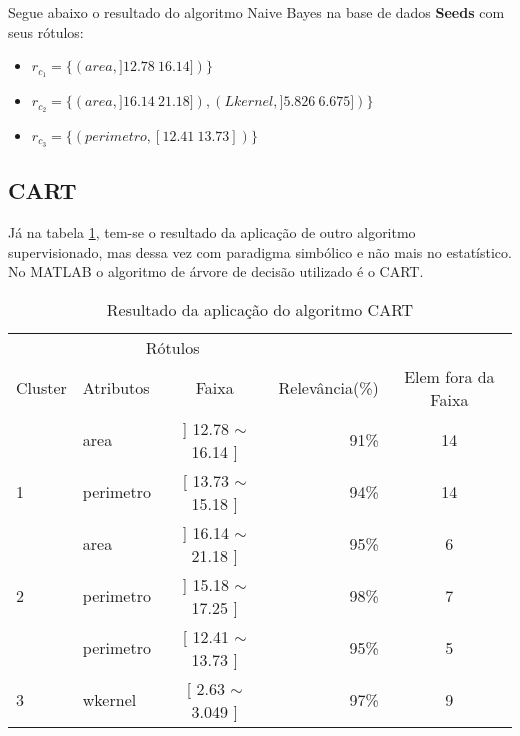 Segue abaixo o resultado do algoritmo Naive Bayes na base de dados \textbf{Seeds} com seus rótulos: 
\begin{itemize}[noitemsep]
 \item ${r_{c_1}=\{ (area, ]12.78 ~ 16.14]) \} }$  
 \item ${r_{c_2}=\{ (area, ]16.14 ~ 21.18]), (Lkernel, ]5.826 ~ 6.675]) \} }$
 \item ${r_{c_3}=\{ (perimetro, [12.41 ~ 13.73])\} }$
\end{itemize}


\subsection{CART}

Já na tabela \ref{tab:rot:seeds:cart}, tem-se o resultado da aplicação de outro algoritmo supervisionado, mas dessa vez com paradigma simbólico e não mais no estatístico. No MATLAB o algoritmo de árvore de decisão utilizado é o CART. 

\begin{table}[!h]
\centering
\caption{Resultado da aplicação do algoritmo CART}
\label{tab:rot:seeds:cart}
\begin{tabular}{llcrc}\hline\hline 

\multicolumn{1}{c}{\cellcolor[HTML]{FFFFFF}} & \multicolumn{2}{c}{Rótulos}                      & \multicolumn{1}{r}{}            \\ \cline{2-3}
Cluster                                      & Atributos      & \multicolumn{1}{c}{Faixa}       & \multicolumn{1}{c}{Relevância(\%)} & Elem fora da Faixa \\ \hline \hline
                                             & area           & ] 12.78 $\sim$  16.14 ]         & 91\%          & 14 \\  
\multirow{-2}{*}{1}                          & perimetro      & [ 13.73 $\sim$ 15.18 ]          & 94\%          & 14\\ \hline
                                             & area           & ] 16.14 $\sim$  21.18 ]          & 95\%         & 6 \\ 
\multirow{-2}{*}{2}                          & perimetro      & ] 15.18 $\sim$  17.25 ]          & 98\%         & 7\\  \hline
                                             & perimetro      & [ 12.41 $\sim$  13.73 ]         & 95\%          & 5 \\
\multirow{-2}{*}{3}                          & wkernel        & [ 2.63 $\sim$  3.049 ]         & 97\%           & 9\\ \hline \hline
\end{tabular}
\end{table}

